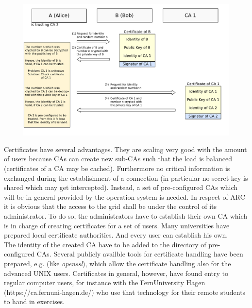 \begin{figure}[htb]
	\centering%
	\includegraphics[width=13cm]{tex_tls_echoservice/verification.pdf}
	\label{fig:verification_of_certificates}
\end{figure}

Certificates have several advantages.
They are scaling very good with the amount of users because CAs can create new sub-CAs such that the load is balanced (certificates of a CA may be cached).
Furthermore no critical information is exchanged during the establishment of a connection (in particular no secret key is shared which may get intercepted).
Instead, a set of pre-configured CAs which will be in general provided by the operation system is needed.
In respect of ARC it is obvious that the access to the grid shall be under the control of its administrator.
To do so, the administrators have to establish their own CA which is in charge of creating certificates for a set of users.
Many universities have prepared local certificate authorities.
And every user can establish his own.\\

The identity of the created CA have to be added to the directory of pre-configured CAs.
Several publicly availble tools for certificate handling have been prepared, e.g. (like \textit{openssl}),
which allow the certificate handling also for the advanced UNIX users.
Certificates in general, however, have found entry to regular computer users, for instance with the FernUniversity Hagen (https://ca.fernuni-hagen.de/) who use that technology for their remote students to hand in exercises.\\

